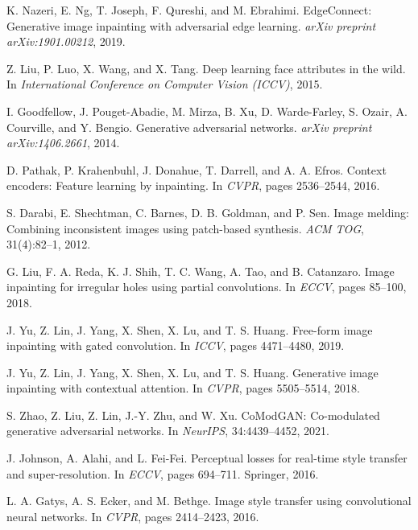 

\begin{thebibliography}{10}

K. Nazeri, E. Ng, T. Joseph, F. Qureshi, and M. Ebrahimi.  
EdgeConnect: Generative image inpainting with adversarial edge learning.  
\textit{arXiv preprint arXiv:1901.00212}, 2019.

Z. Liu, P. Luo, X. Wang, and X. Tang.  
Deep learning face attributes in the wild.  
In \textit{International Conference on Computer Vision (ICCV)}, 2015.

I. Goodfellow, J. Pouget-Abadie, M. Mirza, B. Xu, D. Warde-Farley, S. Ozair, A. Courville, and Y. Bengio.  
Generative adversarial networks.  
\textit{arXiv preprint arXiv:1406.2661}, 2014.

D. Pathak, P. Krahenbuhl, J. Donahue, T. Darrell, and A. A. Efros.  
Context encoders: Feature learning by inpainting.  
In \textit{CVPR}, pages 2536–2544, 2016.

S. Darabi, E. Shechtman, C. Barnes, D. B. Goldman, and P. Sen.  
Image melding: Combining inconsistent images using patch-based synthesis.  
\textit{ACM TOG}, 31(4):82–1, 2012.

G. Liu, F. A. Reda, K. J. Shih, T. C. Wang, A. Tao, and B. Catanzaro.  
Image inpainting for irregular holes using partial convolutions.  
In \textit{ECCV}, pages 85--100, 2018.

J. Yu, Z. Lin, J. Yang, X. Shen, X. Lu, and T. S. Huang.  
Free-form image inpainting with gated convolution.  
In \textit{ICCV}, pages 4471--4480, 2019.

J. Yu, Z. Lin, J. Yang, X. Shen, X. Lu, and T. S. Huang.  
Generative image inpainting with contextual attention.  
In \textit{CVPR}, pages 5505--5514, 2018.

S. Zhao, Z. Liu, Z. Lin, J.-Y. Zhu, and W. Xu.  
CoModGAN: Co-modulated generative adversarial networks.  
In \textit{NeurIPS}, 34:4439--4452, 2021.

J. Johnson, A. Alahi, and L. Fei-Fei.  
Perceptual losses for real-time style transfer and super-resolution.  
In \textit{ECCV}, pages 694–711. Springer, 2016.

L. A. Gatys, A. S. Ecker, and M. Bethge.  
Image style transfer using convolutional neural networks.  
In \textit{CVPR}, pages 2414–2423, 2016.


\end{thebibliography}
